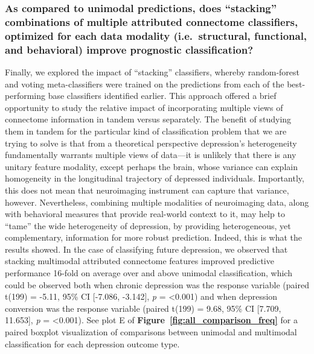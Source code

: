 \documentclass[
  notitlepage]{article}
\begin{document}
\hypertarget{as-compared-to-unimodal-predictions-does-stacking-combinations-of-multiple-attributed-connectome-classifiers-optimized-for-each-data-modality-i.e.-structural-functional-and-behavioral-improve-prognostic-classification}{%
\subsubsection{As compared to unimodal predictions, does ``stacking''
combinations of multiple attributed connectome classifiers, optimized
for each data modality (i.e.~structural, functional, and behavioral)
improve prognostic
classification?}\label{as-compared-to-unimodal-predictions-does-stacking-combinations-of-multiple-attributed-connectome-classifiers-optimized-for-each-data-modality-i.e.-structural-functional-and-behavioral-improve-prognostic-classification}}
Finally, we explored the impact of ``stacking'' classifiers, whereby
random-forest and voting meta-classifiers were trained on the
predictions from each of the best-performing base classifiers identified
earlier. This approach offered a brief opportunity to study the relative
impact of incorporating multiple views of connectome information in
tandem versus separately. The benefit of studying them in tandem for the
particular kind of classification problem that we are trying to solve is
that from a theoretical perspective depression's heterogeneity
fundamentally warrants multiple views of data---it is unlikely that
there is any unitary feature modality, except perhaps the brain, whose
variance can explain homogeneity in the longitudinal trajectory of
depressed individuals. Importantly, this does not mean that neuroimaging
instrument can capture that variance, however. Nevertheless, combining
multiple modalities of neuroimaging data, along with behavioral measures
that provide real-world context to it, may help to ``tame'' the wide
heterogeneity of depression, by providing heterogeneous, yet
complementary, information for more robust prediction. Indeed, this is
what the results showed. In the case of classifying future depression,
we observed that stacking multimodal attributed connectome features
improved predictive performance 16-fold on average over and above
unimodal classification, which could be observed both when chronic
depression was the response variable (paired t(199) = -5.11, 95\% CI
{[}-7.086, -3.142{]}, \emph{p} = \textless0.001) and when depression
conversion was the response variable (paired t(199) = 9.68, 95\% CI
{[}7.709, 11.653{]}, \emph{p} = \textless0.001). See plot E of \textbf{Figure~\ref{fig:all_comparison_freq}} for a paired boxplot visualization of
comparisons between unimodal and multimodal classification for each
depression outcome type.
\end{document}
